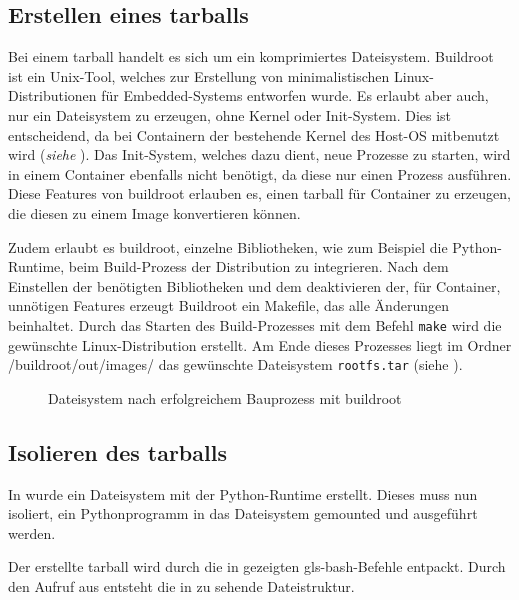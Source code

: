 \subsection{Erstellen eines tarballs}
\label{sec:tarball}
Bei einem tarball handelt es sich um ein komprimiertes Dateisystem. Buildroot ist ein Unix-Tool, welches zur Erstellung von minimalistischen Linux-Distributionen für Embedded-Systems entworfen wurde. Es erlaubt aber auch, nur ein Dateisystem zu erzeugen, ohne Kernel oder Init-System. Dies ist entscheidend, da bei Containern der bestehende Kernel des Host-OS mitbenutzt wird (\textit{siehe }). Das Init-System, welches dazu dient, neue Prozesse zu starten, wird in einem Container ebenfalls nicht benötigt, da diese nur einen Prozess ausführen. Diese Features von buildroot erlauben es, einen tarball für Container zu erzeugen, die diesen zu einem Image konvertieren können.

Zudem erlaubt es buildroot, einzelne Bibliotheken, wie zum Beispiel die Python-Runtime, beim Build-Prozess der Distribution zu integrieren. Nach dem Einstellen der benötigten Bibliotheken und dem deaktivieren der, für Container, unnötigen Features erzeugt Buildroot ein Makefile, das alle Änderungen beinhaltet. Durch das Starten des Build-Prozesses mit dem Befehl \texttt{make} wird die gewünschte Linux-Distribution erstellt. Am Ende dieses Prozesses liegt im Ordner /buildroot/out/images/ das gewünschte Dateisystem \texttt{rootfs.tar} (siehe ).

\begin{figure}[h]
		\centering
		\begin{minipage}{0.9\textwidth}
		\end{minipage}
		\caption{Dateisystem nach erfolgreichem Bauprozess mit buildroot}
		\label{fig:dirtreeNachBuildroot}
\end{figure} 


\subsection{Isolieren des tarballs}
\label{sec:isolieren}
In  wurde ein Dateisystem mit der Python-Runtime erstellt. Dieses muss nun isoliert, ein Pythonprogramm in das Dateisystem gemounted und ausgeführt werden.

Der erstellte tarball wird durch die in  gezeigten \gls{gls-bash}-Befehle entpackt. Durch den Aufruf aus  entsteht die in  zu sehende Dateistruktur.

